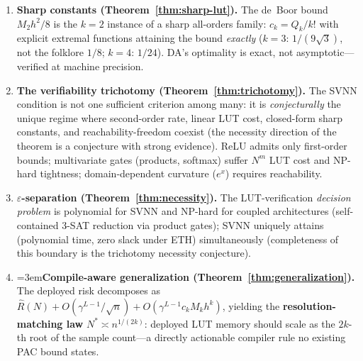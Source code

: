 \documentclass[journal,onecolumn]{IEEEtran}
\begin{document}
\begin{enumerate}[label=(\roman*)]
    \item \textbf{Sharp constants (Theorem~\ref{thm:sharp-lut}).}
    The de~Boor bound $M_2 h^2/8$ is the $k=2$ instance of a sharp
    all-orders family: $c_k = Q_k/k!$ with explicit extremal functions
    attaining the bound \emph{exactly} ($k=3$: $1/(9\sqrt{3})$, not the
    folklore $1/8$; $k=4$: $1/24$). DA's optimality is exact, not
    asymptotic---verified at machine precision.

    \item \textbf{The verifiability trichotomy
    (Theorem~\ref{thm:trichotomy}).}
    The SVNN condition is not one sufficient criterion among many: it is
    \emph{conjecturally} the unique regime where second-order rate,
    linear LUT cost, closed-form sharp constants, and reachability-freedom
    coexist (the necessity direction of the theorem is a conjecture with
    strong evidence).
    ReLU admits only first-order bounds; multivariate gates (products,
    softmax) suffer $N^m$ LUT cost and NP-hard tightness; domain-dependent
    curvature ($e^x$) requires reachability.

    \item \textbf{$\varepsilon$-separation
    (Theorem~\ref{thm:necessity}).}
    The LUT-verification \emph{decision problem} is polynomial for SVNN
    and NP-hard for coupled architectures (self-contained 3-SAT reduction
    via product gates); SVNN uniquely attains (polynomial time, zero
    slack under ETH) simultaneously (completeness of this boundary is the
    trichotomy necessity conjecture).

    \item \begingroup{}\emergencystretch=3em\textbf{Compile-aware generalization
    (Theorem~\ref{thm:generalization}).}
    The deployed risk decomposes as
    \hspace{0pt}$\hat{R}(N) + O(\gamma^{L-1}/\sqrt{n}) + O(\gamma^{L-1}c_kM_kh^k)$,
    yielding the \textbf{resolution-matching law}
    $N^{*} \asymp n^{1/(2k)}$:\hspace{0pt} deployed LUT memory should scale as the
    $2k$-th root of the sample count---a directly actionable compiler
    rule no existing PAC bound states.\par\endgroup


\end{enumerate}
\end{document}
